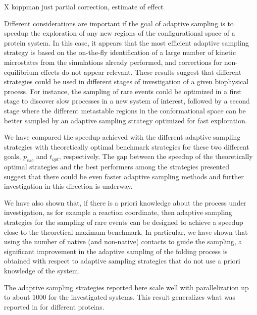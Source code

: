 X koppman just partial correction, estimate of effect

Different considerations are important if the goal of adaptive sampling is to
speedup the exploration of any new regions of the configurational space of a
protein system. In this case, it appears that the most efficient adaptive
sampling strategy is based on the on-the-fly identification of a large number
of kinetic microstates from the simulations already performed, and corrections
for non-equilibrium effects do not appear relevant.
These results suggest that different strategies could be used in different
stages of investigation of a given biophysical process. For instance, the
sampling of rare events could be optimized in a first stage to discover slow
processes in a new system of interest, followed by a second stage where the
different metastable regions in the conformational space can be better sampled
by an adaptive sampling strategy optimized for fast exploration.

We have compared the speedup achieved with the different adaptive sampling
strategies with theoretically optimal benchmark strategies for these two
different goals, $p_{esc}$ and $t_{opt}$, respectively.  The gap between the
speedup of the theoretically optimal strategies and the best performers among
the strategies presented suggest that there could be even faster 
adaptive sampling methods and further investigation in this direction is underway.

We have also shown that, if there is a priori knowledge about the process
under investigation, as for example a reaction coordinate, then adaptive
sampling strategies for the sampling of rare events can be designed to achieve
a speedup close to the theoretical maximum benchmark. In particular, we have
shown that using the number of native (and non-native) contacts to guide the sampling, a
significant improvement in the adaptive sampling of the folding process is
obtained with respect to adaptive sampling strategies that do not use a priori
knowledge of the system.

The adaptive sampling strategies reported here scale well with parallelization
up to about 1000 for the investigated systems.  This result generalizes what
was reported in \cite{bowman2010enhanced} for different proteins. 

